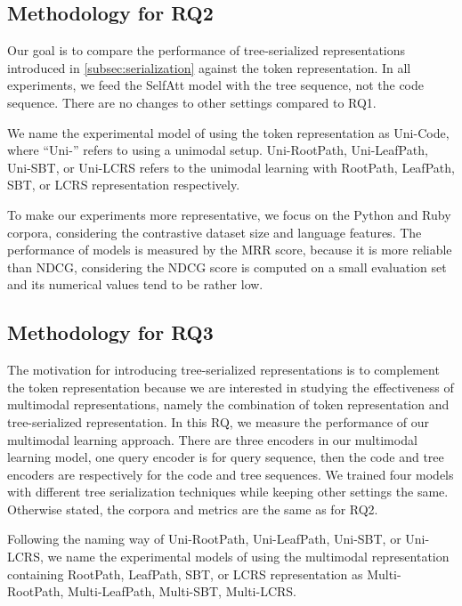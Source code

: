 \documentclass[conference]{IEEEtran}
\begin{document}
\subsection{Methodology for RQ2}
\label{subsec:mrq2}

\emph{\rqbbb}

Our goal is to compare the performance of tree-serialized representations introduced in \autoref{subsec:serialization} against the token representation. In all experiments, we feed the SelfAtt model with the tree sequence, not the code sequence. There are no changes to other settings compared to RQ1.

We name the experimental model of using the token representation as Uni-Code, where ``Uni-'' refers to using a unimodal setup. Uni-RootPath, Uni-LeafPath, Uni-SBT, or Uni-LCRS refers to the unimodal learning with RootPath, LeafPath, SBT, or LCRS representation respectively.

To make our experiments more representative, we focus on the Python and Ruby corpora, considering the contrastive dataset size and language features. The performance of models is measured by the MRR score, because it is more reliable than NDCG, considering the NDCG score is computed on a small evaluation set and its numerical values tend to be rather low.

\subsection{Methodology for RQ3}
\label{subsec:mrq3}

\emph{\rqccc}

The motivation for introducing tree-serialized representations is to complement the token representation because we are interested in studying the effectiveness of multimodal representations, namely the combination of token representation and tree-serialized representation. In this RQ, we measure the performance of our multimodal learning approach. There are three encoders in our multimodal learning model, one query encoder is for query sequence, then the code and tree encoders are respectively for the code and tree sequences. We trained four models with different tree serialization techniques while keeping other settings the same. Otherwise stated, the corpora and metrics are the same as for RQ2.

Following the naming way of Uni-RootPath, Uni-LeafPath, Uni-SBT, or Uni-LCRS, we name the experimental models of using the multimodal representation containing RootPath, LeafPath, SBT, or LCRS representation as Multi-RootPath, Multi-LeafPath, Multi-SBT, Multi-LCRS.
\end{document}
